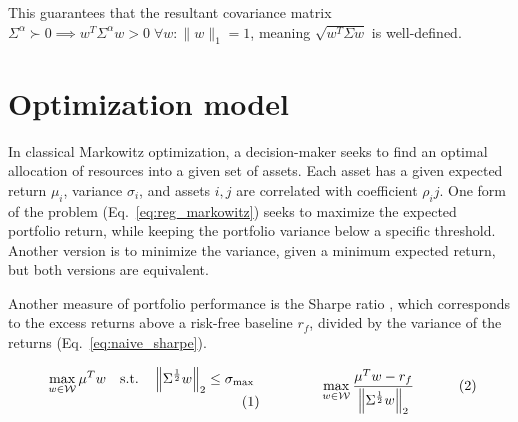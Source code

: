 \documentclass[11pt]{article}
\renewcommand{\a}{\alpha}
\begin{document}
This guarantees that the resultant covariance matrix $\Sigma^\alpha \succ0\implies w^T\Sigma^\a w > 0 \;\forall w : \|w\|_1=1$, meaning $\sqrt{w^T\Sigma w}$ is well-defined.



\section{Optimization model}

In classical Markowitz optimization, a decision-maker seeks to find an optimal allocation of resources into a given set of assets. Each asset has a given expected return $\mu_i$, variance $\sigma_i$, and assets $i, j$ are correlated with coefficient $\rho_ij$. One form of the problem (Eq.~\ref{eq:reg_markowitz}) seeks to maximize the expected portfolio return, while keeping the portfolio variance below a specific threshold. Another version is to minimize the variance, given a minimum expected return, but both versions are equivalent.

Another measure of portfolio performance is the Sharpe ratio \citep{sharpe1964}, which corresponds to the excess returns above a risk-free baseline $r_f$, divided by the variance of the returns (Eq.~\ref{eq:naive_sharpe}).

\begin{subequations}
\begin{minipage}{0.45\textwidth}
    \vspace{-.5cm}
    \begin{equation}\label{eq:reg_markowitz}
        \max_{w \in \mathcal{W}} \mu^T w
        \quad \text{s.t.} \quad \left\|\Sigma^{\frac{1}{2}}w\right\|_2 \leq \sigma_{\max}
    \end{equation}
\end{minipage}
\hfill
\begin{minipage}{0.45\textwidth}
    \begin{equation}\label{eq:naive_sharpe}
        \max_{w \in \mathcal{W}} \frac{\mu^T w - r_f}{\left\|\Sigma^{\frac{1}{2}}w\right\|_2}
    \end{equation}
\end{minipage}
\end{subequations}
\end{document}
